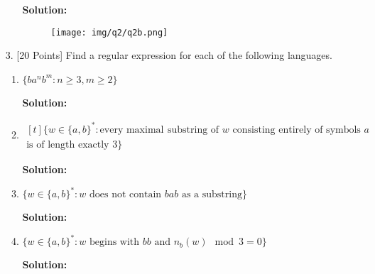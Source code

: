 \documentclass[12pt]{article}
\begin{document}
\begin{spacing}{1.5}
\begin{enumerate}
\begin{enumerate}
                              \textbf{Solution:}

                              \begin{figure}[h!]
                                    \centering
                                    \texttt{[image: img/q2/q2b.png]}
                              \end{figure}
                  \end{enumerate}

                  \newpage
            \item[3.] [20 Points] Find a regular expression for each of the following languages.

                  \begin{enumerate}
                        \item $\{ba^nb^m : n \geq 3, m \geq 2 \}$

                              \textbf{Solution:}

                        \item
                              $
                                    \begin{aligned}[t]
                                          \{ w \in \{a,b \}^* : \text{every maximal } & \text{substring of } w \text{ consisting entirely of symbols $a$} \\ \text{is of length exactly 3} \}
                                    \end{aligned}
                              $

                              \textbf{Solution:}

                        \item $\{w \in \{a,b \}^* : w \text{ does not contain $bab$ as a substring} \}$

                              \textbf{Solution:}

                        \item $\{w \in \{a,b\}^* : w \text{ begins with $bb$ and } n_b(w) \mod 3 = 0 \}$

                              \textbf{Solution:}
                  \end{enumerate}

      \end{enumerate}

\end{spacing}
\end{document}
